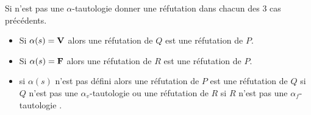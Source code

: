 \begin{Exercise}\it 

Si  n'est pas une $\alpha$-tautologie donner une réfutation dans chacun des 3 cas précédents.
\end{Exercise}
\begin{Answer} 
\begin{itemize}
\item Si $\alpha(s)={\bf V}$ alors une réfutation de $Q$ est une réfutation de $P$.
\item Si $\alpha(s)={\bf F}$ alors une réfutation de $R$ est une réfutation de $P$.
\item si $\alpha(s)$ n'est pas défini alors une réfutation de $P$ est une réfutation de $Q$ si $Q$ n'est pas une $\alpha_v$-tautologie ou une réfutation de $R$ si $R$ n'est pas une $\alpha_f$-tautologie  .
\end{itemize}
\end{Answer}

